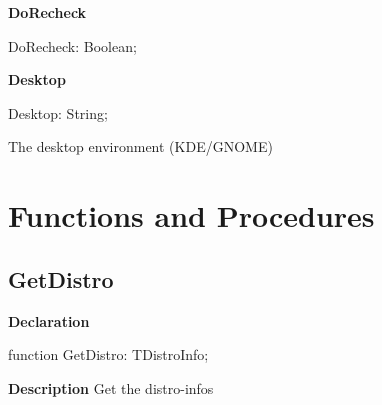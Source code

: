 \documentclass{report}
\newif\ifpdf
\begin{document}
\begin{list}{}
\begin{flushleft}
\ifpdf
\end{flushleft}
\fi


\par  \label{distri.TDistroInfo-DoRecheck}
\item[\textbf{DoRecheck}\hfill]
\ifpdf
\begin{flushleft}
\fi
\begin{ttfamily}
DoRecheck:    Boolean;\end{ttfamily}

\ifpdf
\end{flushleft}
\fi


\par  \label{distri.TDistroInfo-Desktop}
\item[\textbf{Desktop}\hfill]
\ifpdf
\begin{flushleft}
\fi
\begin{ttfamily}
Desktop: String;\end{ttfamily}

\ifpdf
\end{flushleft}
\fi


\par The desktop environment (KDE/GNOME)\end{list}
\section{Functions and Procedures}
\ifpdf
\subsection*{\large{\textbf{GetDistro}}\normalsize\hspace{1ex}\hrulefill}
\else
\subsection*{GetDistro}
\fi
\label{distri-GetDistro}
\begin{list}{}{
\setlength{\itemindent}{0cm}
\setlength{\listparindent}{0cm}
\setlength{\leftmargin}{\evensidemargin}
\addtolength{\leftmargin}{\tmplength}
\settowidth{\labelsep}{X}
\addtolength{\leftmargin}{\labelsep}
\setlength{\labelwidth}{\tmplength}
}
\item[\textbf{Declaration}\hfill]
\ifpdf
\begin{flushleft}
\fi
\begin{ttfamily}
function GetDistro: TDistroInfo;\end{ttfamily}

\ifpdf
\end{flushleft}
\fi

\par
\item[\textbf{Description}]
Get the distro{-}infos

\end{list}
\ifpdf
\end{document}
